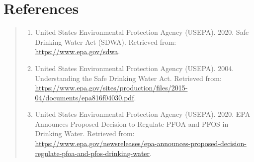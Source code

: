 \documentclass[12pt,]{article}
\providecommand{\tightlist}{%
  \setlength{\itemsep}{0pt}\setlength{\parskip}{0pt}}
\begin{document}
\newpage

\hypertarget{references}{%
\section{References}\label{references}}

\begin{quote}
\begin{enumerate}
\def\labelenumi{\arabic{enumi}.}
\tightlist
\item
  United States Environmental Protection Agency (USEPA). 2020. Safe
  Drinking Water Act (SDWA). Retrieved from:
  \url{https://www.epa.gov/sdwa}.
\item
  United States Environmental Protection Agency (USEPA). 2004.
  Understanding the Safe Drinking Water Act. Retrieved from:
  \url{https://www.epa.gov/sites/production/files/2015-04/documents/epa816f04030.pdf}.
\item
  United States Environmental Protection Agency (USEPA). 2020. EPA
  Announces Proposed Decision to Regulate PFOA and PFOS in Drinking
  Water. Retrieved from:
  \url{https://www.epa.gov/newsreleases/epa-announces-proposed-decision-regulate-pfoa-and-pfos-drinking-water}.
\end{enumerate}
\end{quote}
\end{document}
